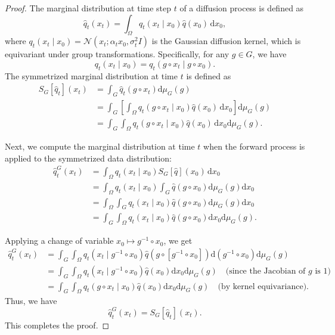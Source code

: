 \begin{proof}
The marginal distribution at time step \(t\) of a diffusion process is defined as
\[
\hat{q}_t(x_t) = \int_\Omega q_t(x_t \mid x_0) \hat{q}(x_0) \, \mathrm{d}x_0,
\]
where \(q_t(x_t \mid x_0) = \mathcal{N}(x_t; \alpha_t x_0, \sigma_t^2 I)\) is the Gaussian diffusion kernel, which is equivariant under group transformations. Specifically, for any \(g \in G\), we have
\[
q_t(x_t \mid x_0) = q_t(g \circ x_t \mid g \circ x_0).
\]
The symmetrized marginal distribution at time \(t\) is defined as
\begin{align*}
S_G[\hat{q}_t](x_t) &= \int_G \hat{q}_t(g \circ x_t) \mathrm{d}\mu_G(g) \\
&= \int_G \left[ \int_\Omega q_t(g \circ x_t \mid x_0) \hat{q}(x_0) \, \mathrm{d}x_0 \right] \mathrm{d}\mu_G(g) \\
&= \int_G \int_\Omega q_t(g \circ x_t \mid x_0) \hat{q}(x_0) \, \mathrm{d}x_0 \mathrm{d}\mu_G(g).
\end{align*}

Next, we compute the marginal distribution at time \(t\) when the forward process is applied to the symmetrized data distribution:
\begin{align*}
\hat{q}_t^G(x_t) &= \int_\Omega q_t(x_t \mid x_0) S_G[\hat{q}](x_0) \, \mathrm{d}x_0 \\
&= \int_\Omega q_t(x_t \mid x_0) \int_G \hat{q}(g \circ x_0) \mathrm{d}\mu_G(g) \mathrm{d}x_0 \\
&= \int_\Omega \int_G q_t(x_t \mid x_0) \hat{q}(g \circ x_0) \mathrm{d}\mu_G(g) \mathrm{d}x_0 \\
&= \int_G \int_\Omega q_t(x_t \mid x_0) \hat{q}(g \circ x_0) \mathrm{d}x_0 \mathrm{d}\mu_G(g).
\end{align*}

Applying a change of variable \(x_0 \mapsto g^{-1} \circ x_0\), we get
\begin{align*}
\hat{q}_t^G(x_t) &= \int_G \int_\Omega q_t(x_t \mid g^{-1} \circ x_0) \hat{q}(g \circ [g^{-1} \circ x_0]) \mathrm{d}(g^{-1} \circ x_0) \mathrm{d}\mu_G(g) \\
&= \int_G \int_\Omega q_t(x_t \mid g^{-1} \circ x_0) \hat{q}(x_0) \mathrm{d}x_0 \mathrm{d}\mu_G(g) \quad \text{(since the Jacobian of \(g\) is 1)} \\
&= \int_G \int_\Omega q_t(g \circ x_t \mid x_0) \hat{q}(x_0) \mathrm{d}x_0 \mathrm{d}\mu_G(g) \quad \text{(by kernel equivariance)}.
\end{align*}
Thus, we have
\[
\hat{q}_t^G(x_t) = S_G[\hat{q}_t](x_t).
\]
This completes the proof.
\end{proof}






